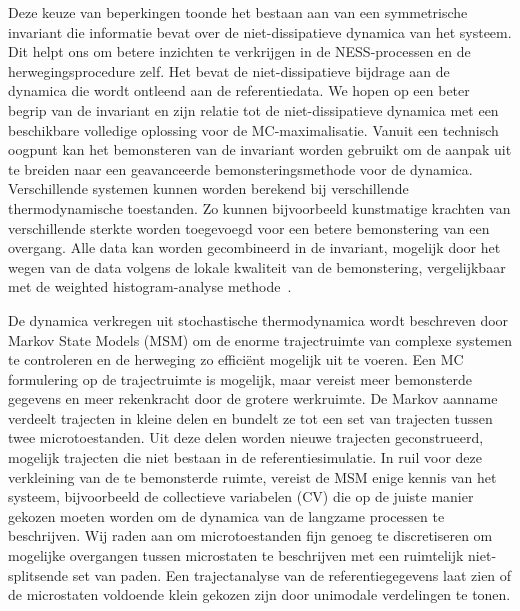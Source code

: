 Deze keuze van beperkingen toonde het bestaan aan van een symmetrische invariant die informatie bevat over de niet-dissipatieve dynamica van het systeem. Dit helpt ons om betere inzichten te verkrijgen in de NESS-processen en de herwegingsprocedure zelf. Het bevat de niet-dissipatieve bijdrage aan de dynamica die wordt ontleend aan de referentiedata.  We hopen op een beter begrip van de invariant en zijn relatie tot de niet-dissipatieve dynamica met een beschikbare volledige oplossing voor de MC-maximalisatie. Vanuit een technisch oogpunt kan het bemonsteren van de invariant worden gebruikt om de aanpak uit te breiden naar een geavanceerde bemonsteringsmethode voor de dynamica. Verschillende systemen kunnen worden berekend bij verschillende thermodynamische toestanden. Zo kunnen bijvoorbeeld kunstmatige krachten van verschillende sterkte worden toegevoegd voor een betere bemonstering van een overgang. Alle data kan worden gecombineerd in de invariant, mogelijk door het wegen van de data volgens de lokale kwaliteit van de bemonstering, vergelijkbaar met de weighted histogram-analyse methode~\cite{kumar1995multidimensional}. 

De dynamica verkregen uit stochastische thermodynamica wordt beschreven door Markov State Models (MSM) om de enorme trajectruimte van complexe systemen te controleren en de herweging zo efficiënt mogelijk uit te voeren. Een MC formulering op de trajectruimte is mogelijk, maar vereist meer bemonsterde gegevens en meer rekenkracht door de grotere werkruimte. De Markov aanname verdeelt trajecten in kleine delen en bundelt ze tot een set van trajecten tussen twee microtoestanden. Uit deze delen worden nieuwe trajecten geconstrueerd, mogelijk trajecten die niet bestaan in de referentiesimulatie. In ruil voor deze verkleining van de te bemonsterde ruimte, vereist de MSM enige kennis van het systeem, bijvoorbeeld de collectieve variabelen (CV) die op de juiste manier gekozen moeten worden om de dynamica van de langzame processen te beschrijven. Wij raden aan om microtoestanden fijn genoeg te discretiseren om mogelijke overgangen tussen microstaten te beschrijven met een ruimtelijk niet-splitsende set van paden. Een trajectanalyse van de referentiegegevens laat zien of de microstaten voldoende klein gekozen zijn door unimodale verdelingen te tonen. 


